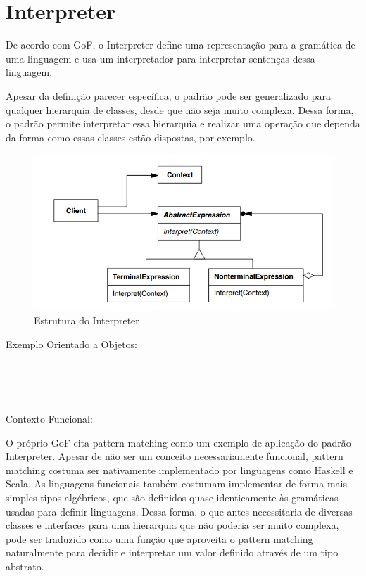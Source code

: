 \section{Interpreter}

De acordo com GoF, o Interpreter define uma representação para 
a gramática de uma linguagem e usa um interpretador para 
interpretar sentenças dessa linguagem.

Apesar da definição parecer específica, o padrão pode ser 
generalizado para qualquer hierarquia de classes, desde que 
não seja muito complexa. Dessa forma, o padrão permite 
interpretar essa hierarquia e realizar uma operação que 
dependa da forma como essas classes estão dispostas, por 
exemplo.

\begin{figure}[htb]
	\caption{\label{interpreter_struct}Estrutura do Interpreter}
	\begin{center}
	    \includegraphics[scale=0.5]{5_padroes-contexto-funcional/5.3_comportamentais/5.3.03_interpreter/diagram.png}
	\end{center}
\end{figure}

Exemplo Orientado a Objetos:

\begin{lstlisting}[caption={Interpreter Orientação a Objetos},label=oointerpreter]


    
\end{lstlisting}

Contexto Funcional:

O próprio GoF cita pattern matching como um exemplo de 
aplicação do padrão Interpreter. Apesar de não ser um 
conceito necessariamente funcional, pattern matching costuma 
ser nativamente implementado por linguagens como Haskell e 
Scala. As linguagens funcionais também costumam implementar 
de forma mais simples tipos algébricos, que são definidos 
quase identicamente às gramáticas usadas para definir 
linguagens. Dessa forma, o que antes necessitaria de diversas 
classes e interfaces para uma hierarquia que não poderia 
ser muito complexa, pode ser traduzido como uma função 
que aproveita o pattern matching naturalmente para decidir 
e interpretar um valor definido através de um tipo abstrato.

\begin{lstlisting}[caption={Interpreter Funcional},label=fpinterpreter]
    

    
\end{lstlisting}